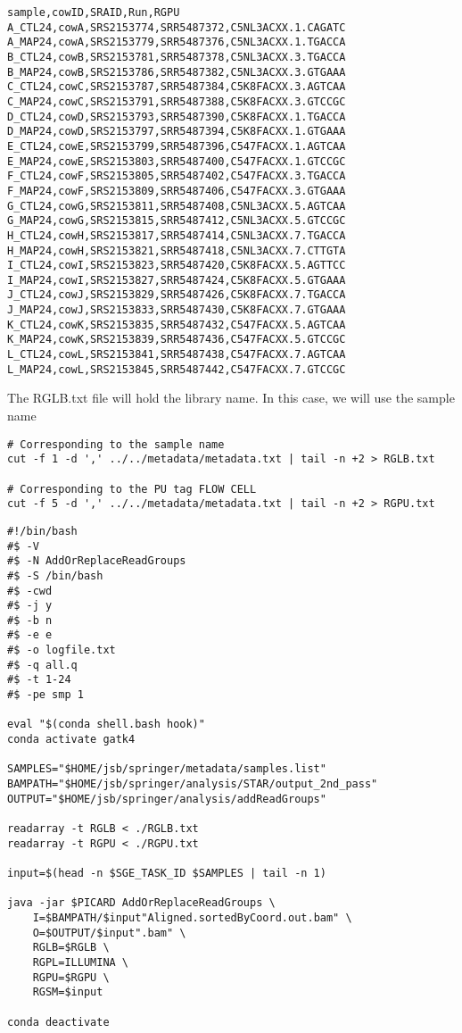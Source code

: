 \begin{verbatim}
sample,cowID,SRAID,Run,RGPU
A_CTL24,cowA,SRS2153774,SRR5487372,C5NL3ACXX.1.CAGATC
A_MAP24,cowA,SRS2153779,SRR5487376,C5NL3ACXX.1.TGACCA
B_CTL24,cowB,SRS2153781,SRR5487378,C5NL3ACXX.3.TGACCA
B_MAP24,cowB,SRS2153786,SRR5487382,C5NL3ACXX.3.GTGAAA
C_CTL24,cowC,SRS2153787,SRR5487384,C5K8FACXX.3.AGTCAA
C_MAP24,cowC,SRS2153791,SRR5487388,C5K8FACXX.3.GTCCGC
D_CTL24,cowD,SRS2153793,SRR5487390,C5K8FACXX.1.TGACCA
D_MAP24,cowD,SRS2153797,SRR5487394,C5K8FACXX.1.GTGAAA
E_CTL24,cowE,SRS2153799,SRR5487396,C547FACXX.1.AGTCAA
E_MAP24,cowE,SRS2153803,SRR5487400,C547FACXX.1.GTCCGC
F_CTL24,cowF,SRS2153805,SRR5487402,C547FACXX.3.TGACCA
F_MAP24,cowF,SRS2153809,SRR5487406,C547FACXX.3.GTGAAA
G_CTL24,cowG,SRS2153811,SRR5487408,C5NL3ACXX.5.AGTCAA
G_MAP24,cowG,SRS2153815,SRR5487412,C5NL3ACXX.5.GTCCGC
H_CTL24,cowH,SRS2153817,SRR5487414,C5NL3ACXX.7.TGACCA
H_MAP24,cowH,SRS2153821,SRR5487418,C5NL3ACXX.7.CTTGTA
I_CTL24,cowI,SRS2153823,SRR5487420,C5K8FACXX.5.AGTTCC
I_MAP24,cowI,SRS2153827,SRR5487424,C5K8FACXX.5.GTGAAA
J_CTL24,cowJ,SRS2153829,SRR5487426,C5K8FACXX.7.TGACCA
J_MAP24,cowJ,SRS2153833,SRR5487430,C5K8FACXX.7.GTGAAA
K_CTL24,cowK,SRS2153835,SRR5487432,C547FACXX.5.AGTCAA
K_MAP24,cowK,SRS2153839,SRR5487436,C547FACXX.5.GTCCGC
L_CTL24,cowL,SRS2153841,SRR5487438,C547FACXX.7.AGTCAA
L_MAP24,cowL,SRS2153845,SRR5487442,C547FACXX.7.GTCCGC
\end{verbatim}

 
The RGLB.txt file will hold the library name. In this case, we will use the sample name
\begin{verbatim}
# Corresponding to the sample name
cut -f 1 -d ',' ../../metadata/metadata.txt | tail -n +2 > RGLB.txt
 
# Corresponding to the PU tag FLOW CELL 
cut -f 5 -d ',' ../../metadata/metadata.txt | tail -n +2 > RGPU.txt
\end{verbatim}





\begin{verbatim}
#!/bin/bash
#$ -V
#$ -N AddOrReplaceReadGroups
#$ -S /bin/bash
#$ -cwd
#$ -j y
#$ -b n
#$ -e e
#$ -o logfile.txt
#$ -q all.q
#$ -t 1-24
#$ -pe smp 1

eval "$(conda shell.bash hook)"
conda activate gatk4	

SAMPLES="$HOME/jsb/springer/metadata/samples.list"
BAMPATH="$HOME/jsb/springer/analysis/STAR/output_2nd_pass"
OUTPUT="$HOME/jsb/springer/analysis/addReadGroups"	

readarray -t RGLB < ./RGLB.txt
readarray -t RGPU < ./RGPU.txt

input=$(head -n $SGE_TASK_ID $SAMPLES | tail -n 1)	

java -jar $PICARD AddOrReplaceReadGroups \
	I=$BAMPATH/$input"Aligned.sortedByCoord.out.bam" \
	O=$OUTPUT/$input".bam" \
	RGLB=$RGLB \
	RGPL=ILLUMINA \
	RGPU=$RGPU \
	RGSM=$input
	
conda deactivate
\end{verbatim}


